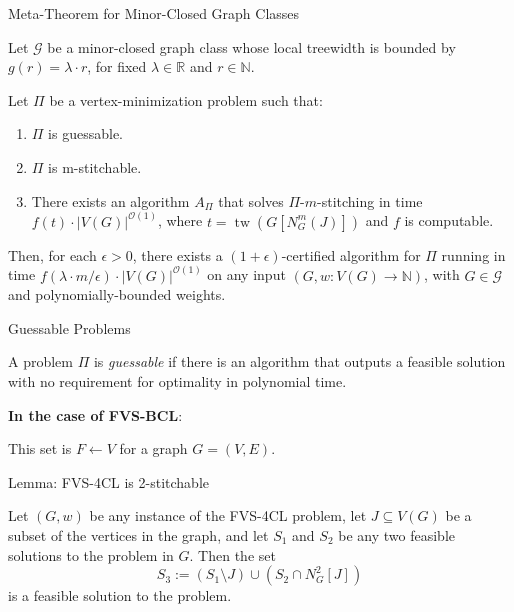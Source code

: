 \documentclass{beamer}
\newcommand{\tw}{\operatorname{tw}}
\begin{document}
\begin{frame}{Meta-Theorem for Minor-Closed Graph Classes}

\begin{theorem}
Let $\mathcal{G}$ be a minor-closed graph class whose local treewidth is bounded by $g(r) = \lambda \cdot r$, for fixed $\lambda \in \mathbb{R}$ and $r \in \mathbb{N}$.

Let $\Pi$ be a vertex-minimization problem such that:
\begin{enumerate}
    \item $\Pi$ is guessable.
    \item $\Pi$ is m-stitchable.
    \item There exists an algorithm $A_\Pi$ that solves $\Pi$-$m$-stitching in time 
    $f(t) \cdot |V(G)|^{\mathcal{O}(1)}$, where $t = \tw(G[N_G^m(J)])$ and $f$ is computable.
\end{enumerate}

Then, for each $\epsilon > 0$, there exists a $(1 + \epsilon)$-certified algorithm for $\Pi$ 
running in time $f(\lambda \cdot m / \epsilon) \cdot |V(G)|^{\mathcal{O}(1)}$ on any input 
$(G, w : V(G) \to \mathbb{N})$, with $G \in \mathcal{G}$ and polynomially-bounded weights.
\end{theorem}

\end{frame}

\begin{frame}{Guessable Problems}
    \begin{definition}[Guessable]
        A problem $\Pi$ is \emph{guessable} if there is an algorithm that outputs a 
        feasible solution 
        with no requirement for optimality in polynomial time.
    \end{definition}

    \textbf{In the case of FVS-BCL}:

    This set is $F \leftarrow V$ for a graph $G = (V, E)$.
\end{frame}

\begin{frame}{Lemma: FVS-4CL is 2-stitchable}
  \begin{lemma}
    Let $(G, w)$ be any instance of the FVS-4CL problem, let $J \subseteq V(G)$ be a subset
    of the vertices in the graph, and let $S_1$ and $S_2$ be any two feasible solutions 
    to the problem in $G$. Then the set
    \[
    S_3 := (S_1 \setminus J) \cup (S_2 \cap N^{2}_{G}[J])
    \]
    is a feasible solution to the problem.
  \end{lemma}
\end{frame}
\end{document}
